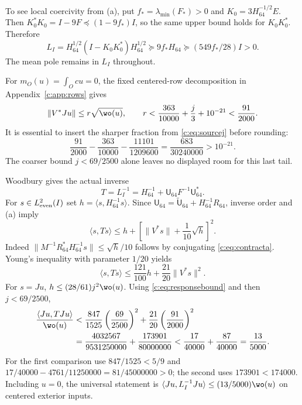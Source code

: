 \documentclass[11pt,a4paper]{article}
\numberwithin{equation}{section}
\theoremstyle{definition}\newtheorem{definition}[theorem]{Definition}
\theoremstyle{remark}\newtheorem{remark}[theorem]{Remark}
\newcommand{\ip}[2]{\langle#1,#2\rangle}\newcommand{\norm}[1]{\lVert#1\rVert}\newcommand{\abs}[1]{\lvert#1\rvert}
\begin{document}
To see local coercivity from (a), put $f_*=\lambda_{\min}(F_*)>0$ and
$K_0=3H_{64}^{-1/2}E$. Then
$K_0^*K_0=I-9F\preceq(1-9f_*)I$, so the same upper bound holds for
$K_0K_0^*$. Therefore
\begin{equation}\label{c:eq:Lcoercive}
 L_I=H_{64}^{1/2}(I-K_0K_0^*)H_{64}^{1/2}
 \succeq9f_*H_{64}\succeq(549f_*/28)I>0.
\end{equation}
The mean pole remains in $L_I$ throughout.

For $m_O(u)=\int_Ocu=0$, the fixed centered-row decomposition in Appendix~\ref{c:app:rows} gives
\begin{equation}\label{c:eq:responsebound}
 \norm{V^*Ju}\le r\sqrt{\wo(u)},\qquad
 r<\frac{363}{10000}+\frac j3+10^{-21}<\frac{91}{2000}.
\end{equation}
It is essential to insert the sharper fraction from \eqref{c:eq:sourcej} before rounding:
\[
 \frac{91}{2000}-\frac{363}{10000}-\frac{11101}{1209600}
 =\frac{683}{30240000}>10^{-21}.
\]
The coarser bound $j<69/2500$ alone leaves no displayed room for this last tail.

Woodbury gives the actual inverse
\[
 T=L_I^{-1}=H_{64}^{-1}+\mathsf U_{64}F^{-1}\mathsf U_{64}^*.
\]
For $s\in L^2_{\rm even}(I)$ set $h=\ip s{H_{64}^{-1}s}$.
Since $\mathsf U_{64}=\widetilde{\mathsf U}_{64}+H_{64}^{-1}R_{64}$, inverse order and (a) imply
\[
 \ip s{Ts}\le h+
 \left[\norm{V^*s}+\frac1{10}\sqrt h\right]^2.
\]
Indeed
$\norm{M^{-1}R_{64}^*H_{64}^{-1}s}\le\sqrt h/10$
follows by conjugating \eqref{c:eq:contracta}.
Young's inequality with parameter $1/20$ yields
\[
 \ip s{Ts}\le\frac{121}{100}h+\frac{21}{20}\norm{V^*s}^2.
\]
For $s=Ju$, $h\le(28/61)j^2\wo(u)$.
Using \eqref{c:eq:responsebound} and then $j<69/2500$,
\begin{align}
 \frac{\ip{Ju}{TJu}}{\wo(u)}
 &<\frac{847}{1525}\left(\frac{69}{2500}\right)^2
 +\frac{21}{20}\left(\frac{91}{2000}\right)^2\notag\\
 &=\frac{4032567}{9531250000}+\frac{173901}{80000000}
 <\frac{17}{40000}+\frac{87}{40000}=\frac{13}{5000}.\label{c:eq:inversecost}
\end{align}
For the first comparison use $847/1525<5/9$ and
$17/40000-4761/11250000=81/45000000>0$; the second uses $173901<174000$.
Including $u=0$, the universal statement is
$\ip{Ju}{L_I^{-1}Ju}\le(13/5000)\wo(u)$ on centered exterior inputs.
\end{document}
